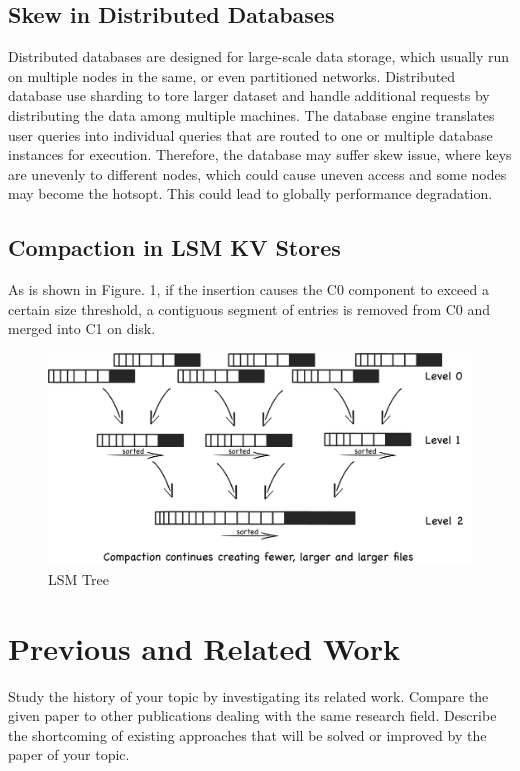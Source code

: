 \documentclass[a4paper,10pt,twoside]{article}
\begin{document}
\subsection{Skew in Distributed Databases}

Distributed databases \cite{mongodb,tidb} are designed for large-scale data storage, which usually run on multiple nodes in the same,
or even partitioned networks.
Distributed database use sharding to tore larger dataset and handle additional requests by distributing the data among multiple machines.
The database engine translates user queries into individual queries that are routed to one or multiple database instances for execution.
Therefore, the database may suffer skew issue, where keys are unevenly to different nodes, which could cause uneven access and some nodes may become the hotsopt.
This could lead to globally performance degradation.

\subsection{Compaction in LSM KV Stores}


As is shown in Figure. 1, if the insertion causes the C0 component to exceed a certain size threshold, a contiguous segment of entries is removed from C0 and merged into C1 on disk.  
\begin{figure}[h]
    \centering
	\includegraphics[scale=0.4]{LSM_Tree1.png}
    \caption{LSM Tree}
    \label{fig:mesh1}
\end{figure}



\section{Previous and Related Work}

Study the history of your topic by investigating its related work.
Compare the given paper to other publications dealing with the same research field.
Describe the shortcoming of existing approaches that will be solved or improved by the paper of your topic.
\end{document}

